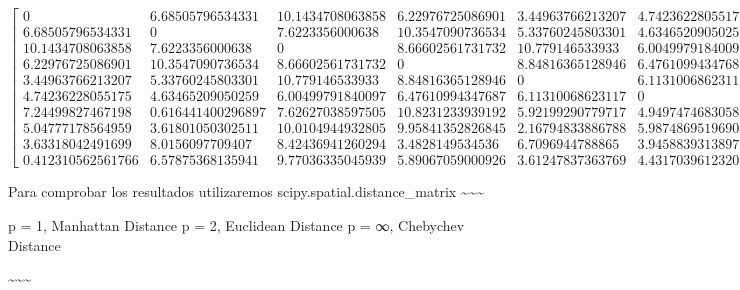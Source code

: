 \documentclass[11pt]{article}
\begin{document}
    $\displaystyle \left[\begin{matrix}0 & 6.68505796534331 & 10.1434708063858 & 6.22976725086901 & 3.44963766213207 & 4.74236228055175 & 7.24499827467198 & 5.04777178564959 & 3.63318042491699 & 0.412310562561766\\6.68505796534331 & 0 & 7.6223356000638 & 10.3547090736534 & 5.33760245803301 & 4.63465209050259 & 0.616441400296897 & 3.61801050302511 & 8.0156097709407 & 6.57875368135941\\10.1434708063858 & 7.6223356000638 & 0 & 8.66602561731732 & 10.779146533933 & 6.00499791840097 & 7.62627038597505 & 10.0104944932805 & 8.42436941260294 & 9.77036335045939\\6.22976725086901 & 10.3547090736534 & 8.66602561731732 & 0 & 8.84816365128946 & 6.47610994347687 & 10.8231233939192 & 9.95841352826845 & 3.4828149534536 & 5.89067059000926\\3.44963766213207 & 5.33760245803301 & 10.779146533933 & 8.84816365128946 & 0 & 6.11310068623117 & 5.92199290779717 & 2.16794833886788 & 6.7096944788865 & 3.61247837363769\\4.74236228055175 & 4.63465209050259 & 6.00499791840097 & 6.47610994347687 & 6.11310068623117 & 0 & 4.94974746830583 & 5.98748695196908 & 3.94588393138977 & 4.43170396123207\\7.24499827467198 & 0.616441400296897 & 7.62627038597505 & 10.8231233939192 & 5.92199290779717 & 4.94974746830583 & 0 & 4.15331193145904 & 8.4717176534632 & 7.13722635202219\\5.04777178564959 & 3.61801050302511 & 10.0104944932805 & 9.95841352826845 & 2.16794833886788 & 5.98748695196908 & 4.15331193145904 & 0 & 7.76916983982201 & 5.10783711564885\\3.63318042491699 & 8.0156097709407 & 8.42436941260294 & 3.4828149534536 & 6.7096944788865 & 3.94588393138977 & 8.4717176534632 & 7.76916983982201 & 0 & 3.29393381840012\\0.412310562561766 & 6.57875368135941 & 9.77036335045939 & 5.89067059000926 & 3.61247837363769 & 4.43170396123207 & 7.13722635202219 & 5.10783711564885 & 3.29393381840012 & 0\end{matrix}\right]$

    
    Para comprobar los resultados utilizaremos
scipy.spatial.distance\_matrix
\textasciitilde\textasciitilde\textasciitilde{}

p = 1, Manhattan Distance p = 2, Euclidean Distance p = ∞, Chebychev
Distance

\textasciitilde\textasciitilde\textasciitilde{}
\end{document}

